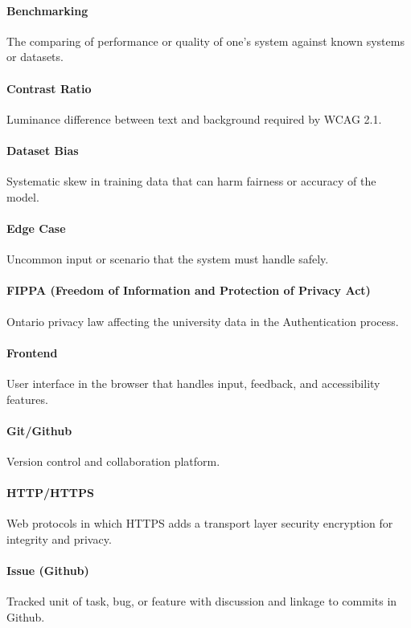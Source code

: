 \documentclass[12pt, titlepage]{article}
\begin{document}
\paragraph*{Benchmarking}
The comparing of performance or quality of one's system against known
systems or datasets.

\paragraph*{Contrast Ratio}
Luminance difference between text and background required by WCAG 2.1.

\paragraph*{Dataset Bias}
Systematic skew in training data that can harm fairness or accuracy
of the model.

\paragraph*{Edge Case}
Uncommon input or scenario that the system must handle safely.

\paragraph*{FIPPA (Freedom of Information and Protection of Privacy Act)}
Ontario privacy law affecting the university data in the Authentication process.

\paragraph*{Frontend}
User interface in the browser that handles input, feedback, and
accessibility features.

\paragraph*{Git/Github}
Version control and collaboration platform.

\paragraph*{HTTP/HTTPS}
Web protocols in which HTTPS adds a transport layer security
encryption for integrity and privacy.

\paragraph*{Issue (Github)}
Tracked unit of task, bug, or feature with discussion and linkage to
commits in Github.
\end{document}
